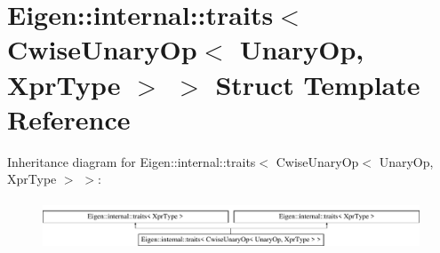 \hypertarget{struct_eigen_1_1internal_1_1traits_3_01_cwise_unary_op_3_01_unary_op_00_01_xpr_type_01_4_01_4}{}\section{Eigen\+:\+:internal\+:\+:traits$<$ Cwise\+Unary\+Op$<$ Unary\+Op, Xpr\+Type $>$ $>$ Struct Template Reference}
\label{struct_eigen_1_1internal_1_1traits_3_01_cwise_unary_op_3_01_unary_op_00_01_xpr_type_01_4_01_4}
Inheritance diagram for Eigen\+:\+:internal\+:\+:traits$<$ Cwise\+Unary\+Op$<$ Unary\+Op, Xpr\+Type $>$ $>$\+:\begin{figure}[H]
\begin{center}
\leavevmode
\includegraphics[height=1.493333cm]{struct_eigen_1_1internal_1_1traits_3_01_cwise_unary_op_3_01_unary_op_00_01_xpr_type_01_4_01_4}
\end{center}
\end{figure}
